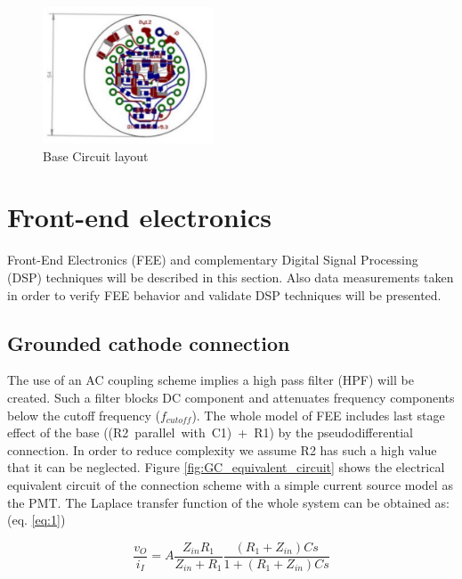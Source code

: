 \documentclass[a4paper, 10pt, oneside, twocolumn, 3p]{elsarticle}
\begin{document}
\begin{figure}
  \begin{center}
    \includegraphics[width=0.45\textwidth]{./figures/7C_layout.pdf}
    \caption{Base Circuit layout}
    \label{fig:7C_layout}
  \end{center}
\end{figure}

\section{Front-end electronics}

\par Front-End Electronics (FEE) and complementary Digital Signal Processing (DSP) techniques will be described in this section. Also data measurements taken in order to verify FEE behavior and validate DSP techniques will be presented. 


\subsection{Grounded cathode connection}

\par The use of an AC coupling scheme implies a high pass filter (HPF) will be created. Such a filter blocks DC component and attenuates frequency components below the cutoff frequency ($f_{cutoff}$). The whole model of FEE includes last stage effect of the base \mbox{((R2 parallel with C1) + R1)} by the pseudodifferential connection. In order to reduce complexity we assume R2 has such a high value that it can be neglected. Figure \ref{fig:GC_equivalent_circuit} shows the electrical equivalent circuit of the connection scheme with a simple current source model as the PMT. The Laplace transfer function of the whole system can be obtained as: (eq. \ref{eq:1})

\begin{equation}
\frac{v_O}{i_I}=A\frac{Z_{in}R_1}{Z_{in}+R_1}\frac{(R_1+Z_{in})Cs}{1+(R_1+Z_{in})Cs}
\label{eq:1}
\end{equation}
\end{document}
